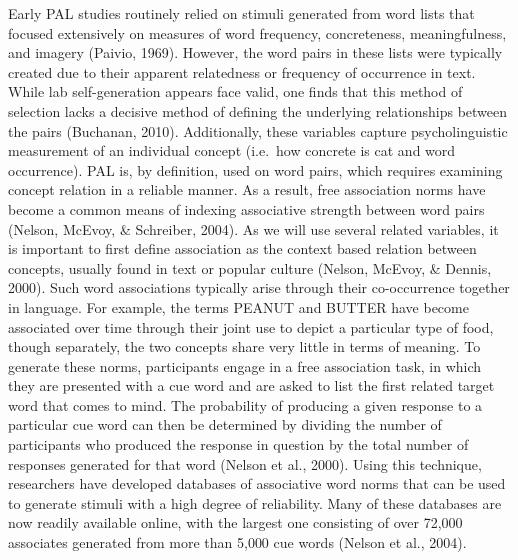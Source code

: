 \documentclass[english,man]{apa6}
\theoremstyle{definition}
\theoremstyle{definition}
\theoremstyle{definition}
\theoremstyle{remark}
\begin{document}
Early PAL studies routinely relied on stimuli generated from word lists
that focused extensively on measures of word frequency, concreteness,
meaningfulness, and imagery (Paivio, 1969). However, the word pairs in
these lists were typically created due to their apparent relatedness or
frequency of occurrence in text. While lab self-generation appears face
valid, one finds that this method of selection lacks a decisive method
of defining the underlying relationships between the pairs (Buchanan,
2010). Additionally, these variables capture psycholinguistic
measurement of an individual concept (i.e.~how concrete is cat and word
occurrence). PAL is, by definition, used on word pairs, which requires
examining concept relation in a reliable manner. As a result, free
association norms have become a common means of indexing associative
strength between word pairs (Nelson, McEvoy, \& Schreiber, 2004). As we
will use several related variables, it is important to first define
association as the context based relation between concepts, usually
found in text or popular culture (Nelson, McEvoy, \& Dennis, 2000). Such
word associations typically arise through their co-occurrence together
in language. For example, the terms PEANUT and BUTTER have become
associated over time through their joint use to depict a particular type
of food, though separately, the two concepts share very little in terms
of meaning. To generate these norms, participants engage in a free
association task, in which they are presented with a cue word and are
asked to list the first related target word that comes to mind. The
probability of producing a given response to a particular cue word can
then be determined by dividing the number of participants who produced
the response in question by the total number of responses generated for
that word (Nelson et al., 2000). Using this technique, researchers have
developed databases of associative word norms that can be used to
generate stimuli with a high degree of reliability. Many of these
databases are now readily available online, with the largest one
consisting of over 72,000 associates generated from more than 5,000 cue
words (Nelson et al., 2004).
\end{document}
